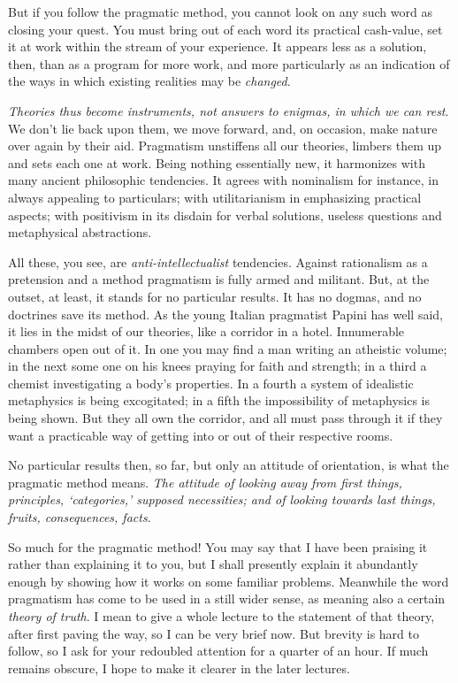 But if you follow the pragmatic method, you cannot look on any such
word as closing your quest. You must bring out of each word its
practical cash-value, set it at work within the stream of your
experience. It appears less as a solution, then, than as a program for
more work, and more particularly as an indication of the ways in which
existing realities may be \textit{changed}.

\textit{Theories thus become instruments, not answers to enigmas, in
which we can rest}. We don't lie back upon them, we move forward, and,
on occasion, make nature over again by their aid. Pragmatism
unstiffens all our theories, limbers them up and sets each one at
work. Being nothing essentially new, it harmonizes with many ancient
philosophic tendencies. It agrees with nominalism for instance, in
always appealing to particulars; with utilitarianism in emphasizing
practical aspects; with positivism in its disdain for verbal 
solutions, useless questions and metaphysical abstractions.

All these, you see, are \textit{anti-intellectualist} tendencies.
Against rationalism as a pretension and a method pragmatism is fully
armed and militant. But, at the outset, at least, it stands for no
particular results. It has no dogmas, and no doctrines save its
method. As the young Italian pragmatist Papini has well said, it lies
in the midst of our theories, like a corridor in a hotel. Innumerable
chambers open out of it. In one you may find a man writing an
atheistic volume; in the next some one on his knees praying for faith
and strength; in a third a chemist investigating a body's properties.
In a fourth a system of idealistic metaphysics is being excogitated;
in a fifth the impossibility of metaphysics is being shown. But they
all own the corridor, and all must pass through it if they want a
practicable way of getting into or out of their respective rooms.

No particular results then, so far, but only an attitude of
orientation, is what the pragmatic method means. \textit{The attitude
of looking away  from first things, principles, `categories,'
supposed necessities; and of looking towards last things, fruits,
consequences, facts}.

So much for the pragmatic method! You may say that I have been
praising it rather than explaining it to you, but I shall presently
explain it abundantly enough by showing how it works on some familiar
problems. Meanwhile the word pragmatism has come to be used in a still
wider sense, as meaning also a certain \textit{theory of truth}. I
mean to give a whole lecture to the statement of that theory, after
first paving the way, so I can be very brief now. But brevity is hard
to follow, so I ask for your redoubled attention for a quarter of an
hour. If much remains obscure, I hope to make it clearer in the later
lectures.

